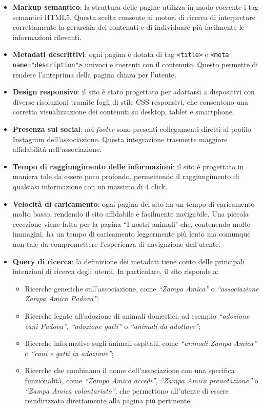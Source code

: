 \documentclass[10pt, letterpaper]{article}
\begin{document}
\begin{itemize}
    \item \textbf{Markup semantico}: la struttura delle pagine utilizza in modo coerente i tag semantici HTML5. Questa scelta consente ai motori di ricerca di interpretare correttamente la gerarchia dei contenuti e di individuare più facilmente le informazioni rilevanti.
    \item \textbf{Metadati descrittivi}: ogni pagina è dotata di tag \texttt{<title>} e \texttt{<meta name="description">} univoci e coerenti con il contenuto. Questo permette di rendere l'anteprima della pagina chiara per l’utente.
    \item \textbf{Design responsivo}: il sito è stato progettato per adattarsi a dispositivi con diverse risoluzioni tramite fogli di stile CSS responsivi, che consentono una corretta visualizzazione dei contenuti su desktop, tablet e smartphone.
    \item \textbf{Presenza sui social}: nel \textit{footer} sono presenti collegamenti diretti al profilo Instagram dell’associazione. Questa integrazione trasmette maggiore affidabilità nell'associazione.
    \item \textbf{Tempo di raggiungimento delle informazioni}: il sito è progettato in maniera tale da essere poco profondo, permettendo il raggiungimento di qualsiasi informazione con un massimo di 4 click.
    \item \textbf{Velocità di caricamento}: ogni pagina del sito ha un tempo di caricamento molto basso, rendendo il sito affidabile e facilmente navigabile. Una piccola eccezione viene fatta per la pagina “I nostri animali" che, contenendo molte immagini, ha un tempo di caricamento leggermente più lento ma comunque non tale da compromettere l’esperienza di navigazione dell’utente.
    \item \textbf{Query di ricerca}: la definizione dei metadati tiene conto delle principali intenzioni di ricerca degli utenti. In particolare, il sito risponde a:
    \begin{itemize}
        \item Ricerche generiche sull’associazione, come \textit{“Zampa Amica”} o \textit{“associazione Zampa Amica Padova”};
        \item Ricerche legate all’adozione di animali domestici, ad esempio \textit{“adozione cani Padova”}, \textit{“adozione gatti”} o \textit{“animali da adottare”};
        \item Ricerche informative sugli animali ospitati, come \textit{“animali Zampa Amica”} o \textit{“cani e gatti in adozione”};
        \item Ricerche che combinano il nome dell’associazione con una specifica funzionalità, come \textit{“Zampa Amica accedi”}, \textit{“Zampa Amica prenotazione”} o \textit{“Zampa Amica volontariato”}, che permettono all’utente di essere reindirizzato direttamente alla pagina più pertinente.
    \end{itemize}
\end{itemize}
\end{document}
